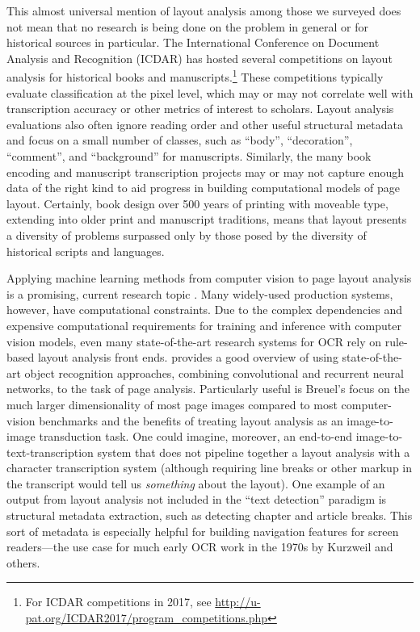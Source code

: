 \documentclass[twoside,11pt]{report}
\begin{document}
This almost universal mention of layout analysis among those we surveyed does not mean that no research is being done on the problem in general or for historical sources in particular. The International Conference on Document Analysis and Recognition (ICDAR) has hosted several competitions on layout analysis for historical books and manuscripts.\footnote{For ICDAR competitions in 2017, see \url{http://u-pat.org/ICDAR2017/program_competitions.php}}  These competitions typically evaluate classification at the pixel level, which may or may not correlate well with transcription accuracy or other metrics of interest to scholars. Layout analysis evaluations also often ignore reading order and other useful structural metadata and focus on a small number of classes, such as ``body'', ``decoration'', ``comment'', and ``background'' for manuscripts. Similarly, the many book encoding and manuscript transcription projects may or may not capture enough data of the right kind to aid progress in building computational models of page layout. Certainly, book design over 500 years of printing with moveable type, extending into older print and manuscript traditions, means that layout presents a diversity of problems surpassed only by those posed by the diversity of historical scripts and languages.

Applying machine learning methods from computer vision to page layout analysis is a promising, current research topic \citep[e.g.,][]{meier17:_fully_convol_neural_networ_newsp_artic_segmen,xu17:_page_segmen_histor_handw_docum,oliveira18}. Many widely-used production systems, however, have computational constraints. Due to the complex dependencies and expensive computational requirements for training and inference with computer vision models, even many state-of-the-art research systems for OCR rely on rule-based layout analysis front ends. \cite{breuel17:_robus_simpl_page_segmen_hybrid} provides a good overview of using state-of-the-art object recognition approaches, combining convolutional and recurrent neural networks, to the task of page analysis. Particularly useful is Breuel's focus on the much larger dimensionality of most page images compared to most computer-vision benchmarks and the benefits of treating layout analysis as an image-to-image transduction task. One could imagine, moreover, an end-to-end image-to-text-transcription system that does not pipeline together a layout analysis with a character transcription system (although requiring line breaks or other markup in the transcript would tell us \emph{something} about the layout). One example of an output from layout analysis not included in the ``text detection'' paradigm is structural metadata extraction, such as detecting chapter and article breaks. This sort of metadata is especially helpful for building navigation features for screen readers---the use case for much early OCR work in the 1970s by Kurzweil and others.
\end{document}
